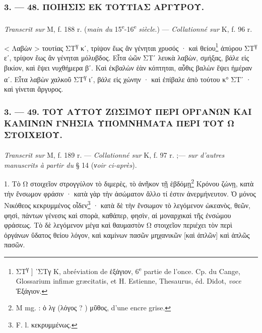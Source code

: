 \documentclass[a4paper, 11pt, oneside, polutonikogreek, french]{article}
\begin{document}
\bigskip
\centerline{\EightStarTaper}
\centerline{\EightStarTaper\EightStarTaper}
\bigskip

\subsubsection{3. --- 48. ΠΟΙΗΣΙΣ ΕΚ ΤΟΥΤΙΑΣ ΑΡΓΥΡΟΥ.}
\paragraph{}
\emph{Transcrit sur} M, f. 188 r. (\emph{main du} 15\textsuperscript{e}-16\textsuperscript{e} \emph{siècle}.) --- \emph{Collationné sur} K, f. 96 r.

\bigskip

< Λαβὼν > τουτίας ΣΤ\textsuperscript{γ} κʹ, τρίψον ἕως ἂν γένηται χρυσός · καὶ θείου\footnote{ΣΤ\textsuperscript{γ} ] ῾ΣΤγ K, abréviation de ἑξάγιον, 6\textsuperscript{e} partie de l'once. Cp. du Cange, Glossarium infimæ græcitatis, et H. Estienne, Thesaurus, éd. Didot, \emph{voce} Ἑξάγιον.} ἀπύρου ΣΤ\textsuperscript{γ} εʹ, τρίψον ἕως ἂν γένηται μόλυβδος. Εἶτα ὠῶν ΣΤʹ λευκὰ λαβὼν, σμήξας, βάλε εἰς βικίον, καὶ ἕψει νυχθήμερα βʹ. Καὶ ἐκβαλὼν ἐὰν κόπτηται, αὖθις βαλὼν ἕψει ἡμέραν αʹ. Εἶτα λαβὼν χαλκοῦ ΣΤ\textsuperscript{γ} ιʹ, βάλε εἰς χώνην · καὶ ἐπίβαλε ἀπὸ τούτου κ° ΣΤʹ · καὶ γίνεται ἄργυρος.

\bigskip
\centerline{\EightStarTaper}
\centerline{\EightStarTaper\EightStarTaper}
\bigskip

\subsubsection{3. --- 49. ΤΟΥ ΑΥΤΟΥ ΖΩΣΙΜΟΥ ΠΕΡΙ ΟΡΓΑΝΩΝ ΚΑΙ ΚΑΜΙΝΩΝ ΓΝΗΣΙΑ ΥΠΟΜΝΗΜΑΤΑ ΠΕΡΙ ΤΟΥ Ω ΣΤΟΙΧΕΙΟΥ.}
\paragraph{}
\emph{Transcrit sur} M, f. 189 r. --- \emph{Collationné sur} K, f. 97 r. ;--- \emph{sur d'autres manuscrits à partir du} § 14 (\emph{νoir ci-après}).

\bigskip

1. Τὸ Ω στοιχεῖον στρογγύλον τὸ διμερὲς, τὸ ἀνῆκον τῇ ἑβδόμῃ\footnote{M mg. : ὁ λγ (λόγος ? ) μῦθος, d'une encre grise.} Κρόνου ζώνῃ, κατὰ τὴν ἔνσωμον φράσιν · κατὰ γὰρ τὴν ἀσώματον ἄλλο τί ἐστιν ἀνερμήνευτον. Ὁ μόνος Νικόθεος κεκρυμμένος οἶδεν\footnote{F. l. κεκρυμμένως.} · κατὰ δὲ τὴν ἔνσωμον τὸ λεγόμενον ὠκεανὸς, θεῶν, φησὶ, πάντων γένεσις καὶ σπορὰ, καθάπερ, φησὶν, αἱ μοναρχικαὶ τῆς ἐνσώμου φράσεως. Τὸ δὲ λεγόμενον μέγα καὶ θαυμαστὸν Ω στοιχεῖον περιέχει τὸν περὶ ὀργάνων ὕδατος θείου λόγον, καὶ καμίνων πασῶν μηχανικῶν [καὶ ἁπλῶν] καὶ ἁπλῶς πασῶν.
\end{document}
